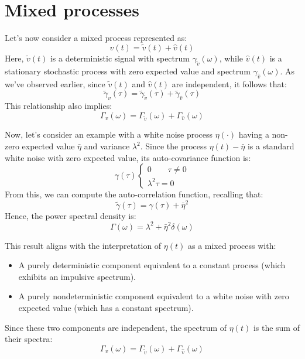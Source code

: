 \section{Mixed processes}

Let's now consider a mixed process represented as:
\[v(t)=\tilde{v}(t)+\hat{v}(t)\]
Here, $\tilde{v}(t)$ is a deterministic signal with spectrum $\gamma_{\tilde{v}}(\omega)$, while $\hat{v}(t)$ is a stationary stochastic process with zero expected value and spectrum $\gamma_{\hat{v}}(\omega)$.
As we've observed earlier, since $\tilde{v}(t)$ and $\hat{v}(t)$ are independent, it follows that:
\[\tilde{\gamma}_v(\tau)=\tilde{\gamma}_{\tilde{v}}(\tau)+\tilde{\gamma}_{\hat{v}}(\tau)\]
This relationship also implies:
\[\Gamma_v(\omega)=\Gamma_{\tilde{v}}(\omega)+\Gamma_{\hat{v}}(\omega)\]
\begin{example}
    Now, let's consider an example with a white noise process $\eta(\cdot)$ having a non-zero expected value $\bar{\eta}$ and variance $\lambda^2$. 
    Since the process $\eta(t)-\bar{\eta}$ is a standard white noise with zero expected value, its auto-covariance function is:
    \[\gamma(\tau)\begin{cases}
        0 \qquad \tau \neq 0 \\
        \lambda^2 \tau = 0
    \end{cases}\]
    From this, we can compute the auto-correlation function, recalling that:
    \[\tilde{\gamma}(\tau)=\gamma(\tau)+\bar{\eta}^2\]
    Hence, the power spectral density is:
    \[\Gamma(\omega)=\lambda^2+\bar{\eta}^2\delta(\omega)\]
\end{example}
This result aligns with the interpretation of $\eta(t)$ as a mixed process with:
\begin{itemize}
    \item A purely deterministic component equivalent to a constant process (which exhibits an impulsive spectrum).
    \item A purely nondeterministic component equivalent to a white noise with zero expected value (which has a constant spectrum).
\end{itemize}
Since these two components are independent, the spectrum of $\eta(t)$ is the sum of their spectra:
\[\Gamma_v(\omega)=\Gamma_{\tilde{v}}(\omega)+\Gamma_{\hat{v}}(\omega)\]